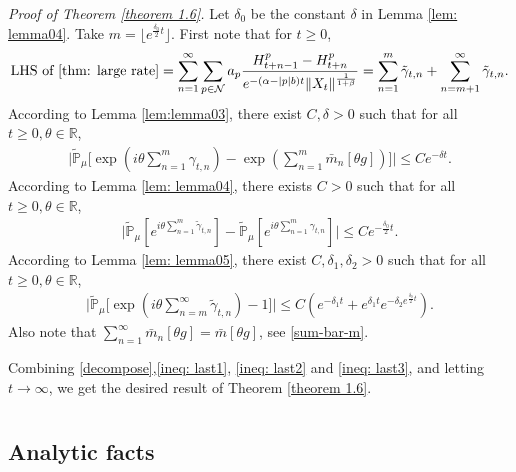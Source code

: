 \documentclass[12pt,a4paper]{amsart}
\theoremstyle{plain}
\theoremstyle{definition}
\numberwithin{equation}{section}
\begin{document}
{\it Proof of Theorem \ref{theorem 1.6}.}\quad
Let $\delta_0$ be the constant $\delta$ in Lemma \ref{lem: lemma04}.  Take $m=\lfloor e^{\frac{\delta_0}{2}t}\rfloor$. First note that for $t\ge 0$,
\begin{align}\label{decompose}
    \text{LHS of \eqref{thm: large rate}}=\sum_{n=1}^{\infty}\sum_{p\in \mathcal{N}}a_p\frac{H^p_{t+n-1}-H^p_{t+n}}{e^{-(\alpha-|p|b)t}\|X_t\|^{\frac{1}{1+\beta}}}=\sum_{n=1}^m\tilde{\gamma}_{t,n}+\sum_{n=m+1}^{\infty}\tilde{\gamma}_{t,n}.
\end{align}
According to Lemma \ref{lem:lemma03}, there exist $C,\delta>0$ such that for all
$t\geq 0,\theta\in\mathbb{R}$, 
\begin{align}\label{ineq: last1}
    \Big|\tilde{\mathbb{P}}_{\mu}\Big[\exp(i\theta\sum_{n=1}^m\gamma_{t,n})-\exp(\sum_{n=1}^m\bar{m}_n[\theta g])\Big]\Big|\leq C e^{-\delta t}.
\end{align}
According to Lemma \ref{lem: lemma04}, there exists $C>0$ such that for all
$t\geq 0,\theta\in\mathbb{R}$, 
\begin{align}\label{ineq: last2}
    \Big|\tilde{\mathbb{P}}_{\mu}[e^{i\theta\sum_{n=1}^m \tilde{\gamma}_{t,n}}]-\tilde{\mathbb{P}}_{\mu}[e^{i\theta \sum_{n=1}^m\gamma_{t,n}}]\Big|\leq C  e^{-\frac{\delta_0}{2} t}.
 \end{align}
 According to Lemma \ref{lem: lemma05}, there exist $C,\delta_1,\delta_2>0$ such that
 for all
$t\geq 0,\theta\in\mathbb{R}$, 
 \begin{align}\label{ineq: last3}
  \Big|\tilde{\mathbb{P}}_{\mu}\Big[\exp(i\theta \sum_{n=m}^{\infty}\tilde{\gamma}_{t,n})-1\Big]\Big|\leq C(e^{-\delta_1 t}+e^{\delta_1 t}e^{-\delta_2 e^{\frac{\delta_0}{2}t}}).
\end{align}
Also note that $\sum_{n=1}^\infty\bar{m}_n[\theta g]=\bar{m}[\theta g]$, see \eqref{sum-bar-m}.

Combining \eqref{decompose},\eqref{ineq: last1}, \eqref{ineq: last2} and \eqref{ineq: last3}, and letting $t\to\infty$, we get the desired result of Theorem \ref{theorem 1.6}.
\appendix
\section{}

\subsection{Analytic facts}
\end{document}
